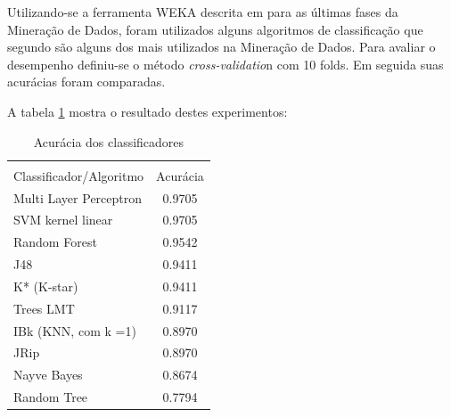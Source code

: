 Utilizando-se a ferramenta WEKA descrita em \cite{eibe2016} para as últimas fases da Mineração de Dados, foram utilizados alguns algoritmos de classificação que segundo  são alguns dos mais utilizados na Mineração de Dados. Para avaliar o desempenho definiu-se o método \textit{cross-validatio}n com 10 folds. Em seguida suas acurácias foram comparadas.

A tabela \ref{tab:acuracias} mostra o resultado destes experimentos:
\begin{table}[h!]
	\centering
	\caption{Acurácia dos classificadores}
	\label{tab:acuracias}
	\vspace{0.3cm}
	\begin{tabular}{p{6cm}c}
		\hline\\
		Classificador/Algoritmo& Acurácia  \\[10pt] 
		\hline
		Multi Layer Perceptron & 0.9705    \\
		SVM kernel linear~     & 0.9705    \\
		Random Forest~		   & 0.9542	   \\
		J48                    & 0.9411    \\
		K* (K-star)            & 0.9411    \\
		Trees LMT              & 0.9117    \\
		IBk (KNN, com k =1)~   & 0.8970    \\
		JRip                   & 0.8970    \\		
		Nayve Bayes            & 0.8674    \\
		Random Tree            & 0.7794    \\
		\hline
	\end{tabular}
	\\[6pt]		
\end{table}


